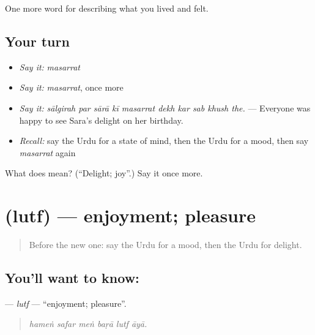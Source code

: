 \begin{grammarlens}[title={What you've built}]
One more word for describing what you lived and felt.
\end{grammarlens}

\subsection*{Your turn}
\begin{itemize}
\raggedright
  \item \emph{Say it:} \emph{masarrat}
  \item \emph{Say it:} \emph{masarrat}, once more
  \item \emph{Say it:} \emph{sālgirah par sārā kī masarrat dekh kar sab khush the.} — Everyone was happy to see Sara's delight on her birthday.
  \item \emph{Recall:} say the Urdu for a state of mind, then the Urdu for a mood, then say \emph{masarrat} again
\end{itemize}

\begin{tcolorbox}[breakable,colback=teal!4,colframe=teal!35!black,title={Before you move on}]
What does  mean? (\textquotedblleft{}Delight; joy\textquotedblright{}.) Say it once more.
\end{tcolorbox}
\section[\texorpdfstring{\ur{لطف} (lutf)}{لطف (lutf)}]{ (lutf) — enjoyment; pleasure}

\label{lesson:UR-C441-lutf}



\begin{quote}
Before the new one: say the Urdu for a mood, then the Urdu for delight.
\end{quote}

\subsection*{You'll want to know: }
\textbf{} — \emph{lutf} — \textquotedblleft{}enjoyment; pleasure\textquotedblright{}.

\begin{quote}
     
\end{quote}

\begin{quote}
\emph{hameṅ safar meṅ baṛā lutf āyā.}
\end{quote}

